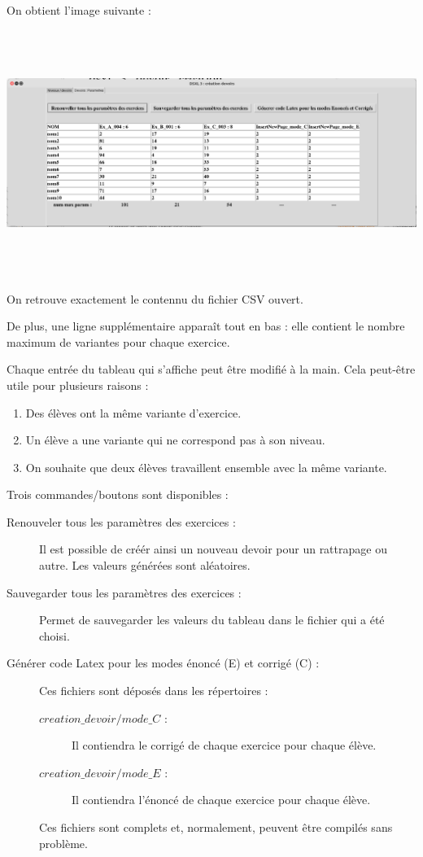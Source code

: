 On obtient l'image suivante : 

 \includegraphics[width=15cm,height=8cm]{./images/creation_devoir_03.png}

On retrouve exactement le contennu du fichier CSV ouvert. 

De plus, une ligne supplémentaire apparaît tout en bas : elle contient le nombre maximum de variantes pour chaque exercice. 

Chaque entrée du tableau qui s'affiche peut être modifié à la main. Cela peut-être utile pour plusieurs raisons : 
\begin{enumerate}
 \item Des élèves ont la même variante d'exercice. 
 \item Un élève a une variante qui ne correspond pas à son niveau.
 \item On souhaite que deux élèves travaillent ensemble avec la même variante.  
\end{enumerate}

Trois commandes/boutons sont disponibles :

\begin{description}
 \item[Renouveler tous les paramètres des exercices : ] Il est possible de créér ainsi un nouveau devoir pour un rattrapage ou autre. Les valeurs générées sont aléatoires. 
 \item[Sauvegarder tous les paramètres des exercices : ] Permet de sauvegarder les valeurs du tableau dans le fichier qui a été choisi. 
 \item[Générer code Latex pour les modes énoncé (E) et corrigé (C) : ] Ces fichiers sont déposés dans les répertoires : 
 \begin{description}
  \item[$creation\_devoir/mode\_C$ : ] Il contiendra le corrigé de chaque exercice pour chaque élève.
   \item[$creation\_devoir/mode\_E$ : ] Il contiendra l'énoncé de chaque exercice pour chaque élève.
 \end{description}
 Ces fichiers sont complets et, normalement, peuvent être compilés sans problème. 
 
\end{description}


